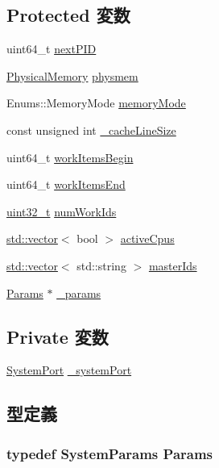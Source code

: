 \subsection*{Protected 変数}
\begin{DoxyCompactItemize}
\item 
uint64\_\-t \hyperlink{classSystem_a940df2387a1775c99f43e7e189a8c0fa}{nextPID}
\item 
\hyperlink{classPhysicalMemory}{PhysicalMemory} \hyperlink{classSystem_aefd0d5534ce05a7596afe30efe297ad8}{physmem}
\item 
Enums::MemoryMode \hyperlink{classSystem_a22abae1a5557f96f7fc5a0ef3c660141}{memoryMode}
\item 
const unsigned int \hyperlink{classSystem_a6e1b97389f603fc046fbb42ba91136e2}{\_\-cacheLineSize}
\item 
uint64\_\-t \hyperlink{classSystem_a479aaf1a4cb34f2bbdd533b4fb8ef412}{workItemsBegin}
\item 
uint64\_\-t \hyperlink{classSystem_a94de121bcd10e5fae1e1aadd6b4ab41b}{workItemsEnd}
\item 
\hyperlink{Type_8hh_a435d1572bf3f880d55459d9805097f62}{uint32\_\-t} \hyperlink{classSystem_a582d58a54a49964f2967b70bcd29f89d}{numWorkIds}
\item 
\hyperlink{classstd_1_1vector}{std::vector}$<$ bool $>$ \hyperlink{classSystem_adaa0501d61f40b707ee3add7379386fe}{activeCpus}
\item 
\hyperlink{classstd_1_1vector}{std::vector}$<$ std::string $>$ \hyperlink{classSystem_af29dc1c2c4242f28c6934043af159765}{masterIds}
\item 
\hyperlink{classSystem_a5f461be6222ce76bffcb70f27d820c56}{Params} $\ast$ \hyperlink{classSystem_afb9ae78c3e2cd51a280162491c99366c}{\_\-params}
\end{DoxyCompactItemize}
\subsection*{Private 変数}
\begin{DoxyCompactItemize}
\item 
\hyperlink{classSystem_1_1SystemPort}{SystemPort} \hyperlink{classSystem_acc373b3a30590f0a6b23b470f85c07b0}{\_\-systemPort}
\end{DoxyCompactItemize}


\subsection{型定義}
\hypertarget{classSystem_a5f461be6222ce76bffcb70f27d820c56}{
\subsubsection[{Params}]{\setlength{\rightskip}{0pt plus 5cm}typedef SystemParams {\bf Params}}}
\label{classSystem_a5f461be6222ce76bffcb70f27d820c56}


